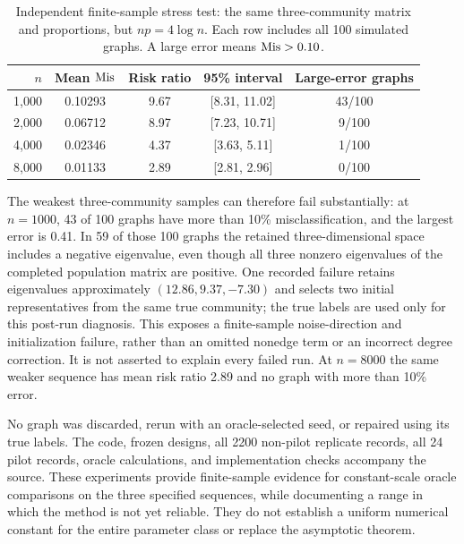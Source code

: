 \begin{table}[htbp]
\centering\small
\caption{Independent finite-sample stress test: the same three-community matrix and proportions, but $np=4\log n$. Each row includes all 100 simulated graphs. A large error means $\operatorname{Mis}>0.10$.}\label{tab:stress}
\begin{tabular}{rcccc}
\toprule
$n$ & Mean $\operatorname{Mis}$ & Risk ratio & 95\% interval & Large-error graphs\\
\midrule
1,000 & 0.10293 & 9.67 & [8.31, 11.02] & 43/100\\
2,000 & 0.06712 & 8.97 & [7.23, 10.71] & 9/100\\
4,000 & 0.02346 & 4.37 & [3.63, 5.11] & 1/100\\
8,000 & 0.01133 & 2.89 & [2.81, 2.96] & 0/100\\
\bottomrule\end{tabular}\end{table}

The weakest three-community samples can therefore fail substantially:
at $n=1000$, 43 of 100 graphs have more than 10\% misclassification,
and the largest error is 0.41. In 59 of those 100 graphs the retained
three-dimensional space includes a negative eigenvalue, even though
all three nonzero eigenvalues of the completed population matrix are
positive. One recorded failure retains eigenvalues approximately
$(12.86,9.37,-7.30)$ and selects two initial representatives from the
same true community; the true labels are used only for this post-run
diagnosis. This exposes a finite-sample noise-direction and initialization
failure, rather than an omitted nonedge term or an incorrect degree
correction. It is not asserted to explain every failed run. At $n=8000$
the same weaker sequence has mean risk ratio 2.89 and no graph with
more than 10\% error.

No graph was discarded, rerun with an oracle-selected seed, or repaired
using its true labels. The code, frozen designs, all 2200 non-pilot
replicate records, all 24 pilot records, oracle calculations, and
implementation checks accompany the source. These experiments provide
finite-sample evidence for constant-scale oracle comparisons on the
three specified sequences, while documenting a range in which the
method is not yet reliable. They do not establish a uniform numerical
constant for the entire parameter class or replace the asymptotic theorem.
